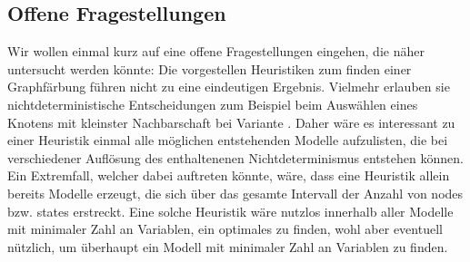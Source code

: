 \documentclass[a4paper]{article}
\theoremstyle{nonumberplain}
\begin{document}
\subsection{Offene Fragestellungen}

Wir wollen einmal kurz auf eine offene Fragestellungen eingehen, die näher untersucht werden könnte:
Die vorgestellen Heuristiken zum finden einer Graphfärbung führen nicht zu eine eindeutigen Ergebnis.
Vielmehr erlauben sie nichtdeterministische Entscheidungen zum Beispiel beim Auswählen eines Knotens mit kleinster Nachbarschaft bei Variante .
Daher wäre es interessant zu einer Heuristik einmal alle möglichen entstehenden Modelle aufzulisten, die bei verschiedener Auflösung des enthaltenenen Nichtdeterminismus entstehen können.
Ein Extremfall, welcher dabei auftreten könnte, wäre, dass eine Heuristik allein bereits Modelle erzeugt, die sich über das gesamte Intervall der Anzahl von nodes bzw. states erstreckt.
Eine solche Heuristik wäre nutzlos innerhalb aller Modelle mit minimaler Zahl an Variablen, ein optimales zu finden, wohl aber eventuell nützlich, um überhaupt ein Modell mit minimaler Zahl an Variablen zu finden.


\printbibliography
\end{document}
